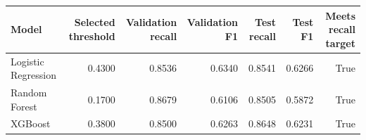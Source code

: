 \begin{tabular}{lrrrrrr}
\toprule
Model & Selected threshold & Validation recall & Validation F1 & Test recall & Test F1 & Meets recall target \\
\midrule
Logistic Regression & 0.4300 & 0.8536 & 0.6340 & 0.8541 & 0.6266 & True \\
Random Forest & 0.1700 & 0.8679 & 0.6106 & 0.8505 & 0.5872 & True \\
XGBoost & 0.3800 & 0.8500 & 0.6263 & 0.8648 & 0.6231 & True \\
\bottomrule
\end{tabular}
